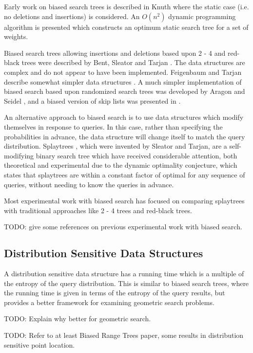 \documentclass[mcs]{scsthesis}
\begin{document}
Early work on biased search trees is described in Knuth \cite{knuth} where
the static case (i.e. no deletions and insertions) is considered.  An \(O(n^2)\)
dynamic programming algorithm is presented which constructs an optimum static
search tree for a set of weights.

Biased search trees allowing insertions and deletions based upon 2 - 4 and
red-black trees were described by Bent, Sleator and Tarjan \cite{bst}.  The
data structures are complex and do not appear to have been implemented.
Feigenbaum and Tarjan describe somewhat simpler data structures \cite{bst2}. A
much simpler implementation of biased search based upon randomized search trees
was developed by Aragon and Seidel \cite{treap}, and a biased version of skip
lists \cite{skiplist} was presented in \cite{bsl2}.

An alternative approach to biased search is to use data structures which
modify themselves in response to queries.  In this case, rather than specifying
the probabilities in advance, the data structure will change itself to match
the query distribution.  Splaytrees \cite{splaytree}, which were invented by
Sleator and Tarjan, are a self-modifying binary search tree which have
received considerable attention, both theoretical and experimental due to the
dynamic optimality conjecture, which states that splaytrees are within a
constant factor of optimal for any sequence of queries, without needing to
know the queries in advance.

Most experimental work with biased search has focused on comparing splaytrees
with traditional approaches like 2 - 4 trees and red-black trees.

TODO: give some references on previous experimental work with biased search.

\subsection{Distribution Sensitive Data Structures}

A distribution sensitive data structure has a running time which is a multiple 
of the entropy of the query distribution.  This is similar to biased search
trees, where the running time is given in terms of the entropy of the query
results, but provides a better framework for examining geometric search
problems.

TODO: Explain why better for geometric search.

TODO: Refer to at least Biased Range Trees paper, some results in distribution
sensitive point location.
\end{document}
